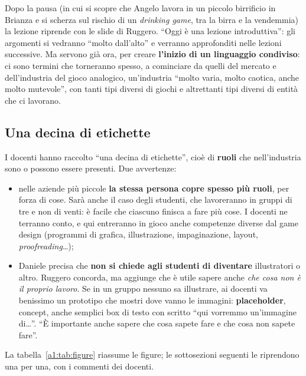 Dopo la pausa (in cui si scopre che Angelo lavora in un piccolo birrificio in
Brianza e si scherza sul rischio di un \emph{drinking game}, tra la birra e la
vendemmia) la lezione riprende con le slide di Ruggero. ``Oggi è una lezione
introduttiva'': gli argomenti si vedranno ``molto dall'alto'' e verranno
approfonditi nelle lezioni successive. Ma servono già ora, per creare
\textbf{l'inizio di un linguaggio condiviso}: ci sono termini che torneranno
spesso, a cominciare da quelli del mercato e dell'industria del gioco
analogico, un'industria ``molto varia, molto caotica, anche molto mutevole'',
con tanti tipi diversi di giochi e altrettanti tipi diversi di entità che ci
lavorano.

\subsection{Una decina di etichette}



I docenti hanno raccolto ``una decina di etichette'', cioè di \textbf{ruoli} che
nell'industria sono o possono essere presenti. Due avvertenze:
\begin{itemize}
  \item nelle aziende più piccole \textbf{la stessa persona copre spesso più
        ruoli}, per forza di cose. Sarà anche il caso degli studenti, che
        lavoreranno in gruppi di tre e non di venti: è facile che ciascuno finisca
        a fare più cose. I docenti ne terranno conto, e qui entreranno in gioco
        anche competenze diverse dal game design (programmi di grafica,
        illustrazione, impaginazione, layout, \emph{proofreading}\ldots);
  \item Daniele precisa che \textbf{non si chiede agli studenti di diventare}
        illustratori o altro. Ruggero concorda, ma aggiunge che è utile sapere
        anche \emph{che cosa non è il proprio lavoro}. Se in un gruppo nessuno sa
        illustrare, ai docenti va benissimo un prototipo che mostri dove vanno
        le immagini: \textbf{placeholder}, concept, anche semplici box di testo
        con scritto ``qui vorremmo un'immagine di\ldots''. ``È importante anche
        sapere che cosa sapete fare e che cosa non sapete fare''.
\end{itemize}
La tabella~\ref{a1:tab:figure} riassume le figure; le sottosezioni seguenti le
riprendono una per una, con i commenti dei docenti.

